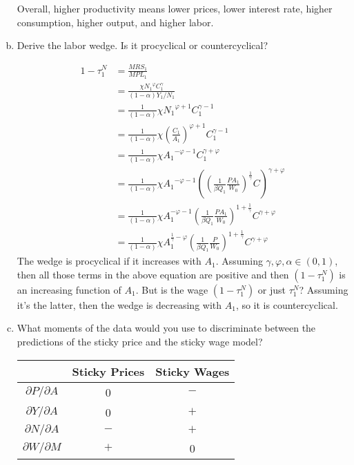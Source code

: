 \documentclass[answers]{exam}
\newcommand{\1}{\mathbf{1}}
\begin{document}
\begin{enumerate}[(a)]
\begin{solution}
        Overall, higher productivity means lower prices, lower interest rate, higher consumption, higher output, and higher labor.
    \end{solution}
	\item Derive the labor wedge. Is it procyclical or countercyclical?
	\begin{solution}
        \begin{align*}
            1 - \tau^N_1 & = \frac{MRS_1}{MPL_1} \\
            & = \frac{\chi {N_1}^\varphi C_1^\gamma}{(1-\alpha)Y_1/N_1} \\
            & = \frac{1}{(1-\alpha)} \chi {N_1}^{\varphi+1} C_1^{\gamma-1} \\
            & = \frac{1}{(1-\alpha)} \chi \left(\frac{C_1}{A_1}\right)^{\varphi+1} C_1^{\gamma-1} \\
            & = \frac{1}{(1-\alpha)} \chi {A_1}^{-\varphi-1} C_1^{\gamma+\varphi} \\
            & = \frac{1}{(1-\alpha)} \chi {A_1}^{-\varphi-1} \left(\left(\frac{1}{\beta Q_1} \frac{P A_1}{W_0}\right)^{\frac{1}{\gamma}} C \right)^{\gamma+\varphi} \\
            & = \frac{1}{(1-\alpha)} \chi A_1^{-\varphi - 1} \left(\frac{1}{\beta Q_1} \frac{P A_1}{W_0}\right)^{1 +\frac{1}{\gamma}}  C^{\gamma+\varphi} \\
            & = \frac{1}{(1-\alpha)} \chi A_1^{\frac{1}{\gamma}-\varphi} \left(\frac{1}{\beta Q_1} \frac{P}{W_0}\right)^{1 +\frac{1}{\gamma}}  C^{\gamma+\varphi}
        \end{align*}
        The wedge is procyclical if it increases with $A_1$. Assuming $\gamma, \varphi, \alpha \in (0,1)$, then all those terms in the above equation are positive and then $(1-\tau_1^N)$ is an increasing function of $A_1$. But is the wage $(1-\tau_1^N)$ or just $\tau_1^N$? Assuming it's the latter, then the wedge is decreasing with $A_1$, so it is countercyclical.
    \end{solution}
	\item What moments of the data would you use to discriminate between the predictions of the sticky price and the sticky wage model?
	\begin{solution}
        \begin{center}
            \begin{tabular}{|c|c|c|}
                \hline
                & Sticky Prices & Sticky Wages \\
                \hline
                $\partial P/\partial A$ & 0 & $-$ \\
                $\partial Y/\partial A$ & 0 & $+$ \\
                $\partial N/\partial A$ & $-$ & $+$ \\
                $\partial W/\partial M$ & $+$ & 0 \\
                \hline
            \end{tabular}
        \end{center}
    \end{solution}
\end{enumerate}
\end{document}
